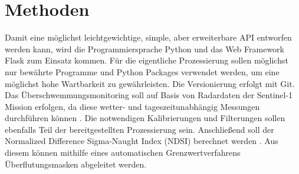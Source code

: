 \newpage
\section{Methoden}
\label{s:Methoden}
Damit eine möglichst leichtgewichtige, simple, aber erweiterbare API entworfen werden kann, wird die Programmiersprache Python und das Web Framework 
Flask zum Einsatz kommen. Für die eigentliche Prozessierung sollen möglichst nur bewährte Programme und Python Packages verwendet werden, um eine möglichst hohe 
Wartbarkeit zu gewährleisten. Die Versionierung erfolgt mit Git. Das Überschwemmungsmonitoring soll auf Basis von Radardaten der Sentinel-1 Mission erfolgen, da diese 
wetter- und tageszeitunabhängig Messungen durchführen können \cite{s1_product_definition}. Die notwendigen Kalibrierungen und Filterungen sollen ebenfalls Teil der 
bereitgestellten Prozessierung sein. Anschließend soll der Normalized Difference Sigma-Naught Index (NDSI) berechnet werden \cite{flood_proxy_mapping_ndsi}. 
Aus diesem können mithilfe eines automatischen Grenzwertverfahrens Überflutungsmasken abgeleitet werden.


